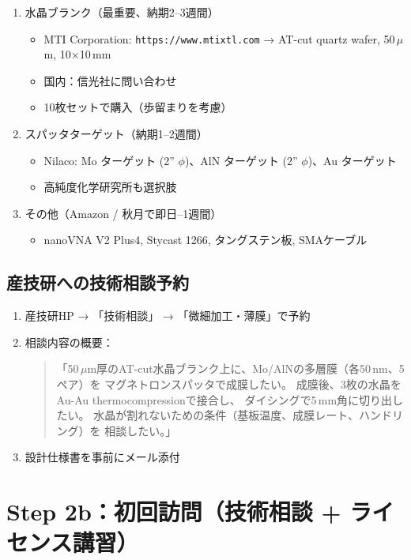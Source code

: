 \documentclass[11pt,a4paper]{article}
\def\textbf#1{#1}%
\begin{document}
\begin{enumerate}[leftmargin=*]
\item \textbf{水晶ブランク}（最重要、納期2--3週間）
  \begin{itemize}
  \item MTI Corporation: \texttt{https://www.mtixtl.com}
    → AT-cut quartz wafer, 50\,$\mu$m, 10$\times$10\,mm
  \item 国内：信光社に問い合わせ
  \item 10枚セットで購入（歩留まりを考慮）
  \end{itemize}
\item \textbf{スパッタターゲット}（納期1--2週間）
  \begin{itemize}
  \item Nilaco: Mo ターゲット (2'' $\phi$)、AlN ターゲット (2'' $\phi$)、Au ターゲット
  \item 高純度化学研究所も選択肢
  \end{itemize}
\item \textbf{その他}（Amazon / 秋月で即日--1週間）
  \begin{itemize}
  \item nanoVNA V2 Plus4, Stycast 1266, タングステン板, SMAケーブル
  \end{itemize}
\end{enumerate}

\subsection{産技研への技術相談予約}

\begin{enumerate}[leftmargin=*]
\item 産技研HP → 「技術相談」 → 「微細加工・薄膜」で予約
\item 相談内容の概要：
  \begin{quote}
  「50\,$\mu$m厚のAT-cut水晶ブランク上に、Mo/AlNの多層膜（各50\,nm、5ペア）を
  マグネトロンスパッタで成膜したい。
  成膜後、3枚の水晶をAu-Au thermocompressionで接合し、
  ダイシングで5\,mm角に切り出したい。
  水晶が割れないための条件（基板温度、成膜レート、ハンドリング）を
  相談したい。」
  \end{quote}
\item 設計仕様書を事前にメール添付
\end{enumerate}


\section{Step 2b：初回訪問（技術相談 + ライセンス講習）}
\end{document}
